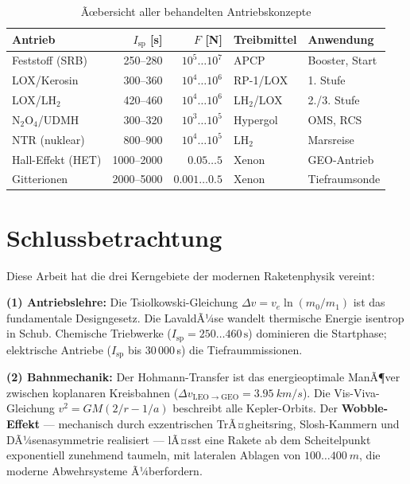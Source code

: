 ﻿\documentclass[12pt,a4paper]{article}
\newcommand{\Isp}{I_{\mathrm{sp}}}
\newcommand{\Dv}{\Delta v}
\begin{document}
\begin{table}[H]
\centering
\caption{Ãœbersicht aller behandelten Antriebskonzepte}
\label{tab:uebersicht}
\begin{tabular}{lrrll}
\toprule
\textbf{Antrieb} & \textbf{$\Isp$ [s]} & \textbf{$F$ [N]} &
\textbf{Treibmittel} & \textbf{Anwendung}\\
\midrule
Feststoff (SRB)   & 250--280  & $10^5\ldots10^7$ & APCP     & Booster, Start\\
LOX/Kerosin       & 300--360  & $10^4\ldots10^6$ & RP-1/LOX & 1. Stufe\\
LOX/LH$_2$        & 420--460  & $10^4\ldots10^6$ & LH$_2$/LOX& 2./3. Stufe\\
N$_2$O$_4$/UDMH   & 300--320  & $10^3\ldots10^5$ & Hypergol & OMS, RCS\\
NTR (nuklear)     & 800--900  & $10^4\ldots10^5$ & LH$_2$   & Marsreise\\
Hall-Effekt (HET) & 1000--2000 & $0.05\ldots5$   & Xenon    & GEO-Antrieb\\
Gitterionen       & 2000--5000 & $0.001\ldots0.5$& Xenon    & Tiefraumsonde\\
\bottomrule
\end{tabular}
\end{table}

\section{Schlussbetrachtung}

Diese Arbeit hat die drei Kerngebiete der modernen Raketenphysik vereint:

\textbf{(1) Antriebslehre:} Die Tsiolkowski-Gleichung $\Dv = v_e\ln(m_0/m_1)$ ist
das fundamentale Designgesetz. Die LavaldÃ¼se wandelt thermische Energie isentrop
in Schub. Chemische Triebwerke ($\Isp=250\ldots460\,\mathrm{s}$) dominieren die
Startphase; elektrische Antriebe ($\Isp$ bis 30\,000\,s) die Tiefraummissionen.

\textbf{(2) Bahnmechanik:} Der Hohmann-Transfer ist das energieoptimale ManÃ¶ver
zwischen koplanaren Kreisbahnen ($\Dv_{\mathrm{LEO}\to\mathrm{GEO}} = \SI{3.95}{km/s}$).
Die Vis-Viva-Gleichung $v^2 = GM(2/r - 1/a)$ beschreibt alle Kepler-Orbits.
Der \textbf{Wobble-Effekt} --- mechanisch durch exzentrischen TrÃ¤gheitsring,
Slosh-Kammern und DÃ¼senasymmetrie realisiert --- lÃ¤sst eine Rakete ab dem
Scheitelpunkt exponentiell zunehmend taumeln, mit lateralen Ablagen von
$100\ldots\SI{400}{m}$, die moderne Abwehrsysteme Ã¼berfordern.
\end{document}
